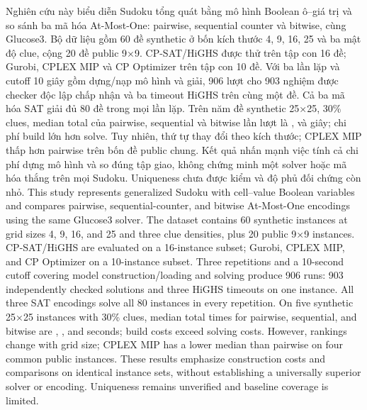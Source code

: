 \ifVietnamese
Nghiên cứu này biểu diễn Sudoku tổng quát bằng mô hình Boolean ô--giá trị và
so sánh ba mã hóa At-Most-One: pairwise, sequential counter và bitwise, cùng
Glucose3. Bộ dữ liệu gồm 60 đề synthetic ở bốn kích thước 4, 9, 16, 25 và ba
mật độ clue, cộng 20 đề public 9×9. CP-SAT/HiGHS được thử trên tập con 16 đề;
Gurobi, CPLEX MIP và CP Optimizer trên tập con 10 đề. Với ba lần lặp và cutoff
10 giây gồm dựng/nạp mô hình và giải, 906 lượt cho 903 nghiệm được checker độc
lập chấp nhận và ba timeout HiGHS trên cùng một đề. Cả ba mã hóa SAT giải đủ
80 đề trong mọi lần lặp. Trên năm đề synthetic 25×25, 30\% clues, median total
của pairwise, sequential và bitwise lần lượt là \PairTotal{}, \SeqTotal{} và \BitTotal{}
giây; chi phí build lớn hơn solve. Tuy nhiên, thứ tự thay đổi theo kích thước;
CPLEX MIP thấp hơn pairwise trên bốn đề public chung. Kết quả nhấn mạnh việc
tính cả chi phí dựng mô hình và so đúng tập giao, không chứng minh một solver
hoặc mã hóa thắng trên mọi Sudoku. Uniqueness chưa được kiểm và độ phủ đối
chứng còn nhỏ.
\else
This study represents generalized Sudoku with cell--value Boolean variables
and compares pairwise, sequential-counter, and bitwise At-Most-One encodings
using the same Glucose3 solver. The dataset contains 60 synthetic instances
at grid sizes 4, 9, 16, and 25 and three clue densities, plus 20 public 9×9
instances. CP-SAT/HiGHS are evaluated on a 16-instance subset; Gurobi, CPLEX
MIP, and CP Optimizer on a 10-instance subset. Three repetitions and a
10-second cutoff covering model construction/loading and solving produce
906 runs: 903 independently checked solutions and three HiGHS timeouts on
one instance. All three SAT encodings solve all 80 instances in every
repetition. On five synthetic 25×25 instances with 30\% clues, median total
times for pairwise, sequential, and bitwise are \PairTotal{}, \SeqTotal{}, and
\BitTotal{} seconds; build costs exceed solving costs. However, rankings change
with grid size; CPLEX MIP has a lower median than pairwise on four common
public instances. These results emphasize construction costs and comparisons
on identical instance sets, without establishing a universally superior
solver or encoding. Uniqueness remains unverified and baseline coverage is
limited.
\fi
